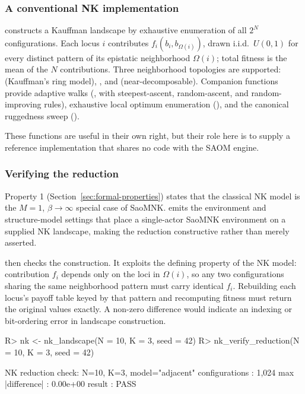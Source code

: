 \documentclass[
  article]{jss}
\begin{document}
\subsubsection{A conventional NK
implementation}\label{a-conventional-nk-implementation}

 constructs a Kauffman landscape by exhaustive
enumeration of all \(2^N\) configurations. Each locus \(i\) contributes
\(f_i(b_i,
b_{\Omega(i)})\), drawn i.i.d.~\(U(0,1)\) for every distinct pattern of
its epistatic neighborhood \(\Omega(i)\); total fitness is the mean of
the \(N\) contributions. Three neighborhood topologies are supported:
 (Kauffman's ring model), , and
 (near-decomposable). Companion functions provide adaptive
walks (, with steepest-ascent, random-ascent, and
random-improving rules), exhaustive local optimum enumeration
(), and the canonical ruggedness sweep
().

These functions are useful in their own right, but their role here is to
supply a reference implementation that shares no code with the SAOM
engine.

\subsubsection{Verifying the reduction}\label{verifying-the-reduction}

Property 1 (Section~\ref{sec:formal-properties}) states that the
classical NK model is the \(M = 1\), \(\beta \rightarrow \infty\)
special case of SaoMNK.  emits the environment
and structure-model settings that place a single-actor SaoMNK
environment on a supplied NK landscape, making the reduction
constructive rather than merely asserted.

 then checks the construction. It exploits
the defining property of the NK model: contribution \(f_i\) depends only
on the loci in \(\Omega(i)\), so any two configurations sharing the same
neighborhood pattern must carry identical \(f_i\). Rebuilding each
locus's payoff table keyed by that pattern and recomputing fitness must
return the original values exactly. A non-zero difference would indicate
an indexing or bit-ordering error in landscape construction.

\begin{CodeChunk}
\begin{CodeInput}
R> nk <- nk_landscape(N = 10, K = 3, seed = 42)
R> nk_verify_reduction(N = 10, K = 3, seed = 42)
\end{CodeInput}
\begin{CodeOutput}
NK reduction check: N=10, K=3, model="adjacent"
  configurations   : 1,024
  max |difference| : 0.00e+00
  result           : PASS
\end{CodeOutput}
\end{CodeChunk}
\end{document}
